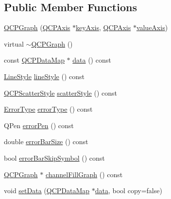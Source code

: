 \subsection*{Public Member Functions}
\begin{DoxyCompactItemize}
\item 
\hyperlink{class_q_c_p_graph_a0393a38cf7183cbf46348eb6cf9a5a6c}{Q\-C\-P\-Graph} (\hyperlink{class_q_c_p_axis}{Q\-C\-P\-Axis} $\ast$\hyperlink{class_q_c_p_abstract_plottable_a72c7a09c22963f2c943f07112b311103}{key\-Axis}, \hyperlink{class_q_c_p_axis}{Q\-C\-P\-Axis} $\ast$\hyperlink{class_q_c_p_abstract_plottable_a3106f9d34d330a6097a8ec5905e5b519}{value\-Axis})
\item 
virtual \hyperlink{class_q_c_p_graph_ae9998cfb9d379ac0ef3fbd6995cfbd76}{$\sim$\-Q\-C\-P\-Graph} ()
\item 
const \hyperlink{qcustomplot_8h_a84a9c4a4c2216ccfdcb5f3067cda76e3}{Q\-C\-P\-Data\-Map} $\ast$ \hyperlink{class_q_c_p_graph_a8f4c17d993df4759c7426db45b33fbc0}{data} () const 
\item 
\hyperlink{class_q_c_p_graph_ad60175cd9b5cac937c5ee685c32c0859}{Line\-Style} \hyperlink{class_q_c_p_graph_ad6db8d31abeac256a285fc68d6b9b9be}{line\-Style} () const 
\item 
\hyperlink{class_q_c_p_scatter_style}{Q\-C\-P\-Scatter\-Style} \hyperlink{class_q_c_p_graph_ae0227c79f4e42a350c2c99fb2fb879db}{scatter\-Style} () const 
\item 
\hyperlink{class_q_c_p_graph_ad23b514404bd2cb3216f57c90904d6af}{Error\-Type} \hyperlink{class_q_c_p_graph_a250bcdf78abac87bc6d46ee6fd99a92d}{error\-Type} () const 
\item 
Q\-Pen \hyperlink{class_q_c_p_graph_a83455e01093bb899f3b59d4a6fdcd57b}{error\-Pen} () const 
\item 
double \hyperlink{class_q_c_p_graph_ae31efdcbc6ba3d73a7aeb83c774f958a}{error\-Bar\-Size} () const 
\item 
bool \hyperlink{class_q_c_p_graph_a04dbc050ff04561658ab1e7f3df37a01}{error\-Bar\-Skip\-Symbol} () const 
\item 
\hyperlink{class_q_c_p_graph}{Q\-C\-P\-Graph} $\ast$ \hyperlink{class_q_c_p_graph_a5369f23863e04a6164f8b66d49fd18f4}{channel\-Fill\-Graph} () const 
\item 
void \hyperlink{class_q_c_p_graph_a1df2fd710545c8ba3b2c99a39a27bf8b}{set\-Data} (\hyperlink{qcustomplot_8h_a84a9c4a4c2216ccfdcb5f3067cda76e3}{Q\-C\-P\-Data\-Map} $\ast$\hyperlink{class_q_c_p_graph_a8f4c17d993df4759c7426db45b33fbc0}{data}, bool copy=false)
\item 

\end{DoxyCompactItemize}
